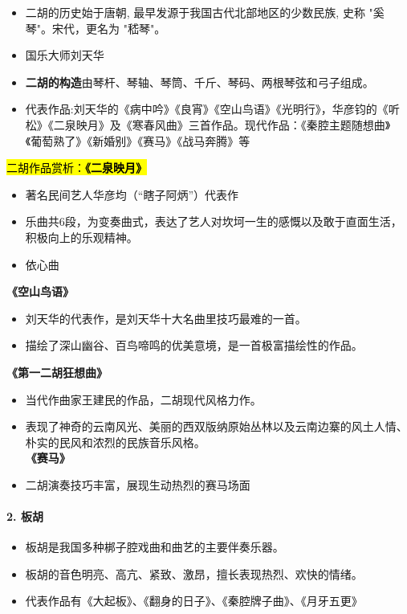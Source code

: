 \documentclass[
]{article}
\providecommand{\tightlist}{%
  \setlength{\itemsep}{0pt}\setlength{\parskip}{0pt}}
\begin{document}
\begin{itemize}
\tightlist
\item
  二胡的历史始于唐朝, 最早发源于我国古代北部地区的少数民族, 史称
  "奚琴"。宋代，更名为 "嵇琴"。
\item
  国乐大师刘天华
\item
  \textbf{二胡的构造}由琴杆、琴轴、琴筒、千斤、琴码、两根琴弦和弓子组成。
\item
  代表作品:刘天华的《病中吟》《良宵》《空山鸟语》《光明行》，华彦钧的《听松》《二泉映月》及《寒春风曲》三首作品。现代作品：《秦腔主题随想曲》《葡萄熟了》《新婚别》《赛马》《战马奔腾》等
\end{itemize}

\hl{\mbox{二胡作品赏析：\textbf{《二泉映月》}}}

\begin{itemize}
\tightlist
\item
  著名民间艺人华彦均（``瞎子阿炳''）代表作
\item
  乐曲共6段，为变奏曲式，表达了艺人对坎坷一生的感慨以及敢于直面生活，积极向上的乐观精神。
\item
  依心曲
\end{itemize}

\textbf{《空山鸟语》}

\begin{itemize}
\tightlist
\item
  刘天华的代表作，是刘天华十大名曲里技巧最难的一首。
\item
  描绘了深山幽谷、百鸟啼鸣的优美意境，是一首极富描绘性的作品。
\end{itemize}

\textbf{《第一二胡狂想曲》}

\begin{itemize}
\tightlist
\item
  当代作曲家王建民的作品，二胡现代风格力作。
\item
  表现了神奇的云南风光、美丽的西双版纳原始丛林以及云南边寨的风土人情、朴实的民风和浓烈的民族音乐风格。\\
  \textbf{《赛马》}
\item
  二胡演奏技巧丰富，展现生动热烈的赛马场面
\end{itemize}

\paragraph{2. 板胡}\label{ux677fux80e1}

\begin{itemize}
\tightlist
\item
  板胡是我国多种梆子腔戏曲和曲艺的主要伴奏乐器。
\item
  板胡的音色明亮、高亢、紧致、激昂，擅长表现热烈、欢快的情绪。
\item
  代表作品有《大起板》、《翻身的日子》、《秦腔牌子曲》、《月牙五更》
\end{itemize}
\end{document}
